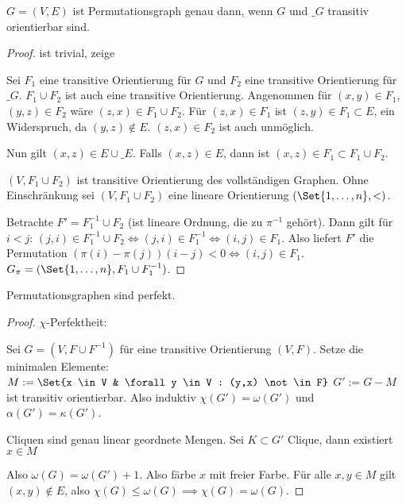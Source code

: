 \begin{st}
    $G = (V, E)$ ist Permutationsgraph genau dann, wenn $G$ und $\_G$ transitiv orientierbar sind.
    \begin{proof}
        \ProofImplication ist trivial, zeige \ProofImplication*

        Sei $F_1$ eine transitive Orientierung für $G$ und $F_2$ eine transitive Orientierung für $\_G$.
        $F_1 \cup F_2$ ist auch eine transitive Orientierung.
        Angenommen für $(x,y) \in F_1$, $(y, z) \in F_2$ wäre $(z,x) \in F_1 \cup F_2$.
        Für $(z,x) \in F_1$ ist $(z, y) \in F_1 \subset E$, ein Widerspruch, da $(y,z) \not\in E$.
        $(z,x) \in F_2$ ist auch unmöglich.

        Nun gilt $(x,z) \in E \cup \_E$.
        Falls $(x, z) \in E$, dann ist $(x, z) \in F_1 \subset F_1 \cup F_2$.

        $(V, F_1 \cup F_2)$ ist transitive Orientierung des vollständigen Graphen.
        Ohne Einschränkung sei $(V, F_1 \cup F_2)$ eine lineare Orientierung $(\Set{1, \dotsc, n}, <)$.

        Betrachte $F' = F_1^{-1} \cup F_2$ (ist lineare Ordnung, die zu $\pi^{-1}$ gehört).
        Dann gilt für $i < j$:
        \begin{math}
            (j,i) \in F_1^{-1} \cup F_2 \iff (j,i) \in F_1^{-1} \iff (i,j) \in F_1.
        \end{math}
        Also liefert $F'$ die Permutation $(\pi(i) - \pi(j))(i - j) < 0 \iff (i,j) \in F_1$.
        $G_\pi = (\Set{1, \dotsc, n}, F_1 \cup F_1^{-1})$.
    \end{proof}
\end{st}

\begin{st}
    Permutationsgraphen sind perfekt.
    \begin{proof}
        $\chi$-Perfektheit:

        Sei $G = (V, F \cup F^{-1})$ für eine transitive Orientierung $(V, F)$.
        Setze die minimalen Elemente:
        \begin{math}
            M := \Set{x \in V & \forall y \in V : (y,x) \not\in F}
        \end{math}
        $G' := G - M$ ist transitiv orientierbar.
        Also induktiv $\chi(G') = \omega(G')$ und $\alpha(G') = \kappa(G')$.

        Cliquen sind genau linear geordnete Mengen.
        Sei $K \subset G'$ Clique, dann existiert $x \in M$

        Also $\omega(G) = \omega(G') + 1$.
        Also färbe $x$ mit freier Farbe.
        Für alle $x,y \in M$ gilt $(x,y) \not\in E$, also $\chi(G) \le \omega(G) \implies \chi(G) = \omega(G)$.
    \end{proof}
\end{st}


